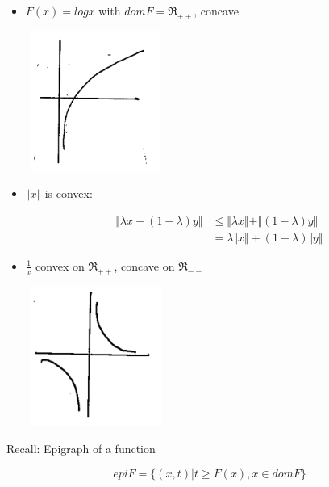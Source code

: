 \begin{itemize}
	\item $F(x) = logx$ with $domF = \Re_{++}$, concave
	
	\begin{marginfigure}
	\centering
	\includegraphics[width=1.8in,height=1.8in]{figures/ch08/figure1030_9.png}
	\end{marginfigure}
	
	\item $\Vert x\Vert$ is convex:
	
	\begin{align*}
	\Vert \lambda x + (1-\lambda)y\Vert &\leq \Vert \lambda x\Vert + \Vert(1-\lambda)y\Vert\\
	&= \lambda \Vert x \Vert + (1-\lambda)\Vert y \Vert
	\end{align*}
	
	\item $\frac{1}{x}$ convex on $\Re_{++}$, concave on $\Re_{--}$
	
	\begin{marginfigure}
	\centering
	\includegraphics[width=1.8in,height=1.8in]{figures/ch08/figure1030_10.png}
	\end{marginfigure}
\end{itemize}

Recall: Epigraph of a function

\begin{equation*}
epiF = \{(x,t)|t\geq F(x), x\in domF \}
\end{equation*}

